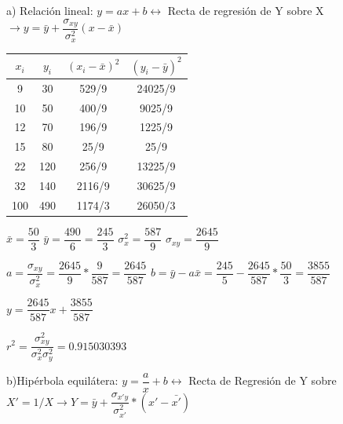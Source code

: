 \documentclass[10pt,a4paper]{article}
\begin{document}
\begin{enumerate}
\hspace{0.5cm} a) Relación lineal: $y = ax + b \longleftrightarrow $ Recta de regresión de Y sobre X $\rightarrow y = \bar{y} + \dfrac{\sigma_{xy}}{\sigma_{x}^2} (x - \bar{x})$

\vspace{0.25cm}
\begin{center}
\begin{tabular}{|c|c|c|c|}
\hline 
$x_i$ & $y_i$ & $(x_i - \bar{x})^2$ & $(y_i - \bar{y})^2$ \\ 
\hline 
9 & 30 & 529/9 & 24025/9 \\ 
\hline 
10 & 50 & 400/9 & 9025/9 \\ 
\hline 
12 & 70 & 196/9 & 1225/9 \\ 
\hline 
15 & 80 & 25/9 & 25/9 \\ 
\hline 
22 & 120 & 256/9 & 13225/9 \\ 
\hline 
32 & 140 & 2116/9 & 30625/9 \\ 
\hline 
100 & 490 & 1174/3 & 26050/3 \\ 
\hline 
\end{tabular} 
\end{center}

\vspace{0.25cm}
$\bar{x} = \dfrac{50}{3}$	\hspace{2cm} $\bar{y} = \dfrac{490}{6} = \dfrac{245}{3}$ \hspace{2cm} $\sigma_x^2 = \dfrac{587}{9}$ \hspace{2cm}  $\sigma_{xy} = \dfrac{2645}{9}$

\vspace{0.25cm}
$a = \dfrac{\sigma_{xy}}{\sigma_{x}^2} = \dfrac{2645}{9} * \dfrac{9}{587} = \dfrac{2645}{587}$ \hspace{2 cm} $b = \bar{y} - a \bar{x} = \dfrac{245}{5} - \dfrac{2645}{587} * \dfrac{50}{3} = \dfrac{3855}{587}$

\vspace{0.25cm}
\begin{center}
$y = \dfrac{2645}{587} x + \dfrac{3855}{587}$ \\  
\end{center}

\vspace{0.25cm} 
$r^2 = \dfrac{\sigma_{xy}^2}{\sigma_x^2 \sigma_y^2} = 0.915030393 $

\vspace{0.5cm} 
\hspace{0.25cm} b)Hipérbola equilátera: $y = \dfrac{a}{x} +b \longleftrightarrow$ Recta de Regresión de Y sobre $X' = 1/X \rightarrow Y = \bar{y} + \dfrac{\sigma_{x'y}}{\sigma_{x'}^2} * (x' - \bar{x'})$


\end{enumerate}
\end{document}
